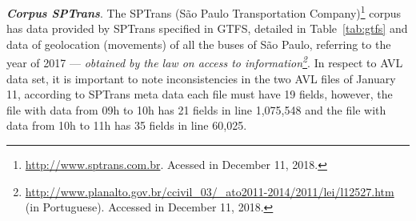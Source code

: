 \documentclass[runningheads]{llncs}
\begin{document}
\begin{table}[!htb]
\centering
\caption{TIME INTERVAL AND NUMBER OF TWEETS COLLECTED}
\label{tab:tweetsCollected}
\end {table}


\textbf{\textit{{Corpus} SPTrans}}. The SPTrans (São Paulo Transportation Company)\footnote{\url{http://www.sptrans.com.br}. Acessed in December 11, 2018.} corpus has data provided by SPTrans specified in GTFS, detailed in Table~\ref{tab:gtfs} and data of geolocation (movements) of all the buses of São Paulo, referring to the year of 2017 --- \emph{obtained by the law on access to information\footnote{\url{http://www.planalto.gov.br/ccivil_03/_ato2011-2014/2011/lei/l12527.htm} (in Portuguese). Accessed in December 11, 2018.}}. In respect to AVL data set, it is important to note inconsistencies in the two AVL files of January 11, according to SPTrans meta data each file must have 19 fields, however, the file with data from 09h to 10h has 21 fields in line 1,075,548 and the file with data from 10h to 11h has 35 fields in line 60,025.
\end{document}
